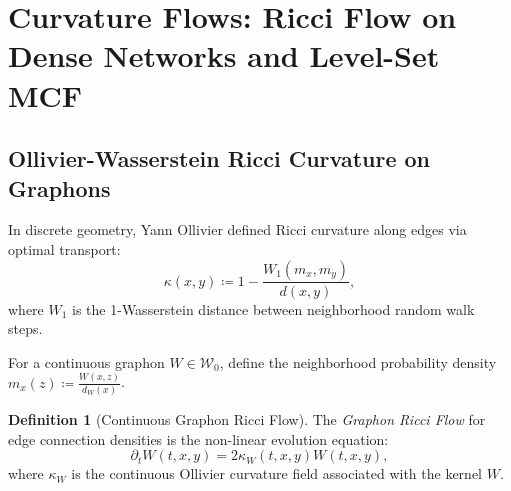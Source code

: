 \documentclass[11pt,a4paper,reqno]{amsart}
\theoremstyle{definition}
\newtheorem{definition}[theorem]{Definition}
\numberwithin{equation}{section}
\begin{document}
\section{Curvature Flows: Ricci Flow on Dense Networks and Level-Set MCF}
\label{sec:curvature_flows}

\subsection{Ollivier-Wasserstein Ricci Curvature on Graphons}
In discrete geometry, Yann Ollivier \cite{ollivier2009ricci} defined Ricci curvature along edges via optimal transport:
\begin{equation}
    \kappa(x, y) \coloneqq 1 - \frac{W_1(m_x, m_y)}{d(x, y)},
\end{equation}
where $W_1$ is the 1-Wasserstein distance between neighborhood random walk steps.

For a continuous graphon $W \in \mathcal{W}_0$, define the neighborhood probability density $m_x(z) \coloneqq \frac{W(x, z)}{d_W(x)}$.

\begin{definition}[Continuous Graphon Ricci Flow]
The \emph{Graphon Ricci Flow} for edge connection densities is the non-linear evolution equation:
\begin{equation}
    \label{eq:graphon_ricci}
    \partial_t W(t, x, y) = 2 \kappa_W(t, x, y) W(t, x, y),
\end{equation}
where $\kappa_W$ is the continuous Ollivier curvature field associated with the kernel $W$.
\end{definition}
\end{document}
